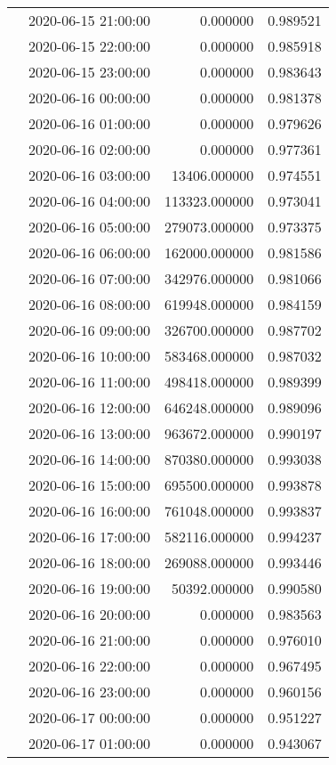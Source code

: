 \begin{tabular}{llrr}
 & 2020-06-15 21:00:00 & 0.000000 & 0.989521 \\
 & 2020-06-15 22:00:00 & 0.000000 & 0.985918 \\
 & 2020-06-15 23:00:00 & 0.000000 & 0.983643 \\
 & 2020-06-16 00:00:00 & 0.000000 & 0.981378 \\
 & 2020-06-16 01:00:00 & 0.000000 & 0.979626 \\
 & 2020-06-16 02:00:00 & 0.000000 & 0.977361 \\
 & 2020-06-16 03:00:00 & 13406.000000 & 0.974551 \\
 & 2020-06-16 04:00:00 & 113323.000000 & 0.973041 \\
 & 2020-06-16 05:00:00 & 279073.000000 & 0.973375 \\
 & 2020-06-16 06:00:00 & 162000.000000 & 0.981586 \\
 & 2020-06-16 07:00:00 & 342976.000000 & 0.981066 \\
 & 2020-06-16 08:00:00 & 619948.000000 & 0.984159 \\
 & 2020-06-16 09:00:00 & 326700.000000 & 0.987702 \\
 & 2020-06-16 10:00:00 & 583468.000000 & 0.987032 \\
 & 2020-06-16 11:00:00 & 498418.000000 & 0.989399 \\
 & 2020-06-16 12:00:00 & 646248.000000 & 0.989096 \\
 & 2020-06-16 13:00:00 & 963672.000000 & 0.990197 \\
 & 2020-06-16 14:00:00 & 870380.000000 & 0.993038 \\
 & 2020-06-16 15:00:00 & 695500.000000 & 0.993878 \\
 & 2020-06-16 16:00:00 & 761048.000000 & 0.993837 \\
 & 2020-06-16 17:00:00 & 582116.000000 & 0.994237 \\
 & 2020-06-16 18:00:00 & 269088.000000 & 0.993446 \\
 & 2020-06-16 19:00:00 & 50392.000000 & 0.990580 \\
 & 2020-06-16 20:00:00 & 0.000000 & 0.983563 \\
 & 2020-06-16 21:00:00 & 0.000000 & 0.976010 \\
 & 2020-06-16 22:00:00 & 0.000000 & 0.967495 \\
 & 2020-06-16 23:00:00 & 0.000000 & 0.960156 \\
 & 2020-06-17 00:00:00 & 0.000000 & 0.951227 \\
 & 2020-06-17 01:00:00 & 0.000000 & 0.943067 \\

\end{tabular}
